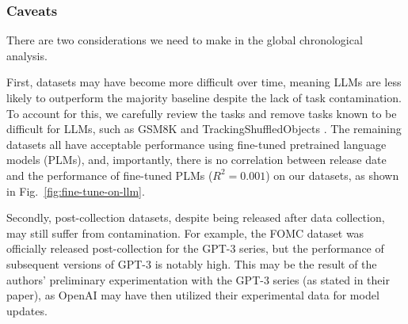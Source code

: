 \documentclass[letterpaper]{article} %
\newcommand{\nilay}[1]{}
\newcommand{\jmf}[1]{}      %
\begin{document}
\subsubsection{Caveats}

\jmf{talk about FOMC dataset: that they used GPT-3 series, and it seems it may be contaminated}

There are two considerations we need to make in the global chronological analysis. 

First, datasets may have become more difficult over time, meaning LLMs are less likely to outperform the majority baseline despite the lack of task contamination. To account for this, we carefully review the tasks and remove tasks known to be difficult for LLMs, such as GSM8K \cite{Cobbe2021} and TrackingShuffledObjects \cite{Srivastava2023}. The remaining datasets all have acceptable performance using fine-tuned pretrained language models (PLMs), and, importantly, there is no correlation between release date and the performance of fine-tuned PLMs ($R^2 = 0.001$) on our datasets, as shown in Fig.~\ref{fig:fine-tune-on-llm}.

Secondly, post-collection datasets, despite being released after data collection, may still suffer from contamination. For example, the FOMC dataset \cite{shah2023} was officially released post-collection for the GPT-3 series, but the performance of subsequent versions of GPT-3 is notably high. This may be the result of the authors' preliminary experimentation with the GPT-3 series (as stated in their paper), as OpenAI may have then utilized their experimental data for model updates.\nilay{Is there any evidence for this? Seems just like speculation without proof, which is fine, but should be clear about it.}

\end{document}
